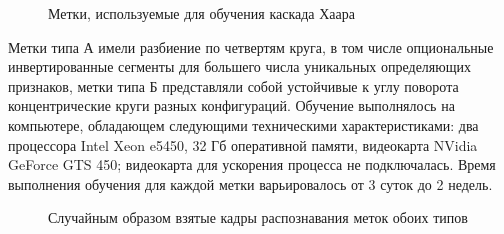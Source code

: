 \begin{figure}[ht]
	\caption{Метки, используемые для обучения каскада Хаара}\label{fig:markers}
\end{figure}

Метки типа А имели разбиение по четвертям круга, в том числе опциональные инвертированные сегменты для большего числа уникальных определяющих признаков, метки типа Б представляли собой устойчивые к углу поворота концентрические круги разных конфигураций. Обучение выполнялось на компьютере, обладающем следующими техническими характеристиками: два процессора Intel Xeon e5450, 32 Гб оперативной памяти, видеокарта NVidia GeForce GTS 450; видеокарта для ускорения процесса не подключалась. Время выполнения обучения для каждой метки варьировалось от 3 суток до 2 недель.

\begin{figure}[ht]
	\caption{Случайным образом взятые кадры распознавания меток обоих типов}\label{fig:markers-res}
\end{figure}

